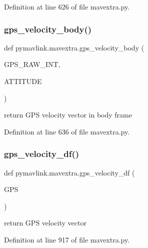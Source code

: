 Definition at line 626 of file mavextra.\+py.

\mbox{\label{namespacepymavlink_1_1mavextra_aee6ba92874105e32ba57d9449475661d}} 
\subsubsection{\texorpdfstring{gps\_velocity\_body()}{gps\_velocity\_body()}}
{\footnotesize\ttfamily def pymavlink.\+mavextra.\+gps\+\_\+velocity\+\_\+body (\begin{DoxyParamCaption}\item[{}]{G\+P\+S\+\_\+\+R\+A\+W\+\_\+\+I\+NT,  }\item[{}]{A\+T\+T\+I\+T\+U\+DE }\end{DoxyParamCaption})}

\begin{DoxyVerb}return GPS velocity vector in body frame\end{DoxyVerb}
 

Definition at line 636 of file mavextra.\+py.

\mbox{\label{namespacepymavlink_1_1mavextra_a283e68b9dcd503bfedb6431c4815660c}} 
\subsubsection{\texorpdfstring{gps\_velocity\_df()}{gps\_velocity\_df()}}
{\footnotesize\ttfamily def pymavlink.\+mavextra.\+gps\+\_\+velocity\+\_\+df (\begin{DoxyParamCaption}\item[{}]{G\+PS }\end{DoxyParamCaption})}

\begin{DoxyVerb}return GPS velocity vector\end{DoxyVerb}
 

Definition at line 917 of file mavextra.\+py.

\mbox{\label{namespacepymavlink_1_1mavextra_aee56305fd91e4db7b5b0a35725659c1c}} 

